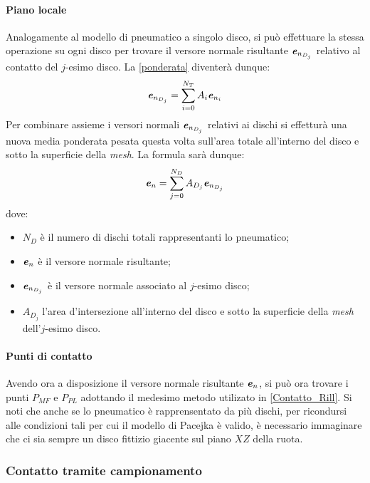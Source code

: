\paragraph{Piano locale}
Analogamente al modello di pneumatico a singolo disco, si può effettuare la stessa operazione su ogni disco per trovare il versore normale risultante $\textbf{\textit{e}}_{n_{D_j}}$ relativo al contatto del $j$-esimo disco. La \eqref{ponderata} diventerà dunque:
%
\begin{equation}
\textbf{\textit{e}}_{n_{D_j}} = \sum_{i=0}^{N_T}A_i\textbf{\textit{e}}_{n_i}
\end{equation}
%
Per combinare assieme i versori normali $\textbf{\textit{e}}_{n_{D_j}}$ relativi ai dischi si effetturà una nuova media ponderata pesata questa volta sull'area totale all'interno del disco e sotto la superficie della \textit{mesh}. La formula sarà dunque:
%
\begin{equation}
\textbf{\textit{e}}_n = \sum_{j=0}^{N_D}A_{D_j}\textbf{\textit{e}}_{n_{D_j}}
\end{equation}
%
dove:
\begin{itemize}
	\item $N_D$ è il numero di dischi totali rappresentanti lo pneumatico;
	\item $\textbf{\textit{e}}_n$ è il versore normale risultante;
	\item $\textbf{\textit{e}}_{n_{D_j}}$ è il versore normale associato al $j$-esimo disco;
	\item $A_{D_j}$ l'area d'intersezione all'interno del disco e sotto la superficie della \textit{mesh} dell'$j$-esimo disco.
\end{itemize}

\paragraph{Punti di contatto}
Avendo ora a disposizione il versore normale risultante $\textbf{\textit{e}}_n$, si può ora trovare i punti $P_{MF}$ e $P_{PL}$ adottando il medesimo metodo utilizato in \ref{Contatto_Rill}. Si noti che anche se lo pneumatico è rapprensentato da più dischi, per ricondursi alle condizioni tali per cui il modello di Pacejka è valido, è necessario immaginare che ci sia sempre un disco fittizio giacente sul piano $XZ$ della ruota.
%
\subsubsection{Contatto tramite campionamento}
